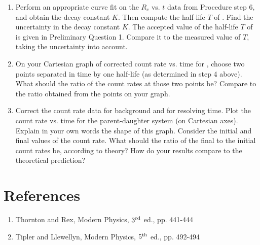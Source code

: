 \begin{enumerate}
\item Perform an appropriate curve fit on the $R_{c}$ vs. $t$ data from
  Procedure step 6, and obtain the decay constant $K$. Then compute the
  half-life $T$ of \bam.  Find the uncertainty in the decay constant $K$.
  The accepted value of the half-life $T$ of
  \bam is given in Preliminary Question 1. Compare it to the measured value of
  $T$, taking the uncertainty into account.


\item On your Cartesian graph of corrected count rate vs. time for \bam, choose
  two points separated in time by one half-life (as determined in step 4 above).
  What should the ratio of the count rates at those two points be?  Compare to
  the ratio obtained from the points on your graph.

\item Correct the \bam count rate data for background and for
resolving time. Plot the count rate vs. time for the
parent-daughter system (on Cartesian axes).  Explain in your own words
the shape of this graph.  Consider the initial and final values of the
count rate.  What should the ratio of the final to the initial count
rates be, according to theory?  How do your results compare to the
theoretical prediction?
\end{enumerate}

\section{References}
\begin{enumerate}
\item Thornton and Rex, Modern Physics, $3^{\rm rd}$ ed., pp. 441-444
\item Tipler and Llewellyn, Modern Physics, $5^{\rm th}$ ed., pp. 492-494
\end{enumerate}
